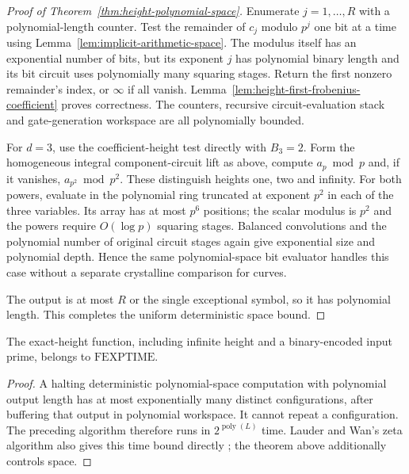 \begin{proof}[Proof of Theorem~\ref{thm:height-polynomial-space}]
Enumerate $j=1,\ldots,R$ with a polynomial-length counter. Test the remainder of $c_j$ modulo $p^j$ one bit at a time using Lemma~\ref{lem:implicit-arithmetic-space}. The modulus itself has an exponential number of bits, but its exponent $j$ has polynomial binary length and its bit circuit uses polynomially many squaring stages. Return the first nonzero remainder's index, or $\infty$ if all vanish. Lemma~\ref{lem:height-first-frobenius-coefficient} proves correctness. The counters, recursive circuit-evaluation stack and gate-generation workspace are all polynomially bounded.

For $d=3$, use the coefficient-height test directly with $B_3=2$. Form the homogeneous integral component-circuit lift as above, compute $a_p\bmod p$ and, if it vanishes, $a_{p^2}\bmod p^2$. These distinguish heights one, two and infinity. For both powers, evaluate in the polynomial ring truncated at exponent $p^2$ in each of the three variables. Its array has at most $p^6$ positions; the scalar modulus is $p^2$ and the powers require $O(\log p)$ squaring stages. Balanced convolutions and the polynomial number of original circuit stages again give exponential size and polynomial depth. Hence the same polynomial-space bit evaluator handles this case without a separate crystalline comparison for curves.

The output is at most $R$ or the single exceptional symbol, so it has polynomial length. This completes the uniform deterministic space bound.
\end{proof}

\begin{corollary}
\label{cor:height-exponential-time}
The exact-height function, including infinite height and a binary-encoded input prime, belongs to $\mathrm{FEXPTIME}$.
\end{corollary}
\begin{proof}
A halting deterministic polynomial-space computation with polynomial output length has at most exponentially many distinct configurations, after buffering that output in polynomial workspace. It cannot repeat a configuration. The preceding algorithm therefore runs in $2^{\operatorname{poly}(L)}$ time. Lauder and Wan's zeta algorithm also gives this time bound directly \citep[Theorems~1 and~37, pp.~580 and~610]{LauderWan2008}; the theorem above additionally controls space.
\end{proof}
